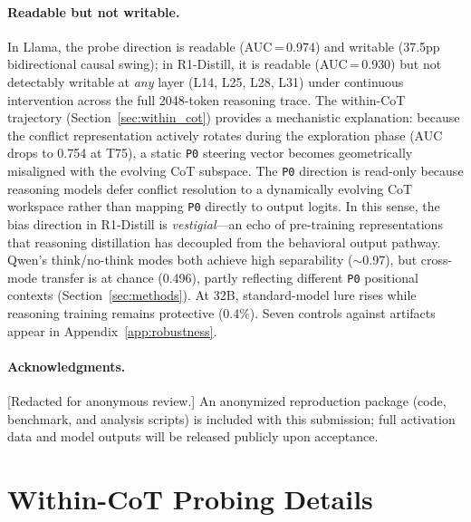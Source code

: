 \documentclass{article}
\newcommand{\pzero}{\texttt{P0}}
\begin{document}
\paragraph{Readable but not writable.}
In Llama, the probe direction is readable (AUC\,=\,0.974) and
writable (37.5pp bidirectional causal swing); in R1-Distill, it is
readable (AUC\,=\,0.930) but not detectably writable at \emph{any}
layer (L14, L25, L28, L31) under continuous intervention across the
full 2048-token reasoning trace.  The within-CoT trajectory
(Section~\ref{sec:within_cot}) provides a mechanistic explanation:
because the conflict representation actively rotates during the
exploration phase (AUC drops to 0.754 at T75), a static \pzero{}
steering vector becomes geometrically misaligned with the evolving
CoT subspace.  The \pzero{} direction is read-only because reasoning
models defer conflict resolution to a dynamically evolving CoT
workspace rather than mapping \pzero{} directly to output logits.
In this sense, the bias direction in R1-Distill is \emph{vestigial}---an
echo of pre-training representations that reasoning distillation has
decoupled from the behavioral output pathway.
Qwen's think/no-think modes both achieve high separability
(${\sim}$0.97), but cross-mode transfer is at chance (0.496),
partly reflecting different \pzero{} positional contexts
(Section~\ref{sec:methods}).
At 32B, standard-model lure rises while reasoning training remains
protective (0.4\%).  Seven controls against artifacts appear in
Appendix~\ref{app:robustness}.

\paragraph{Acknowledgments.}
[Redacted for anonymous review.]
An anonymized reproduction package (code, benchmark, and analysis scripts)
is included with this submission; full activation data and model outputs
will be released publicly upon acceptance.





\appendix

\section{Within-CoT Probing Details}
\label{app:within_cot}
\end{document}
